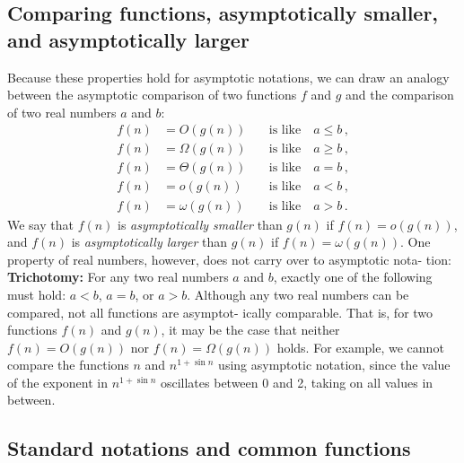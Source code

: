 \documentclass{report}
\begin{document}
        \pagebreak 
        \subsection{Comparing functions, asymptotically smaller, and asymptotically larger}
        \bigbreak \noindent 
        Because these properties hold for asymptotic notations, we can draw an analogy between the asymptotic comparison of two functions $f$ and $g$ and the comparison of two real numbers $a$ and $b$:
        \bigbreak \noindent 
        \[
            \begin{aligned}
                f(n) &= O(g(n)) \quad &\text{is like} \quad a \leq b \, , \\
                f(n) &= \Omega(g(n)) \quad &\text{is like} \quad a \geq b \, , \\
                f(n) &= \Theta(g(n)) \quad &\text{is like} \quad a = b \, , \\
                f(n) &= o(g(n)) \quad &\text{is like} \quad a < b \, , \\
                f(n) &= \omega(g(n)) \quad &\text{is like} \quad a > b \, .
            \end{aligned}
        \]
        We say that \( f(n) \) is \textit{asymptotically smaller} than \( g(n) \) if \( f(n) = o(g(n)) \), and \( f(n) \) 
        is \textit{asymptotically larger} than \( g(n) \) if \( f(n) = \omega(g(n)) \).
        \bigbreak \noindent 
        One property of real numbers, however, does not carry over to asymptotic nota-
        tion:
        \bigbreak \noindent 
        \textbf{Trichotomy:} For any two real numbers \( a \) and \( b \), exactly one of the following must 
        hold: \( a < b \), \( a = b \), or \( a > b \).
        \bigbreak \noindent 
        Although any two real numbers can be compared, not all functions are asymptot-
        ically comparable. That is, for two functions \( f(n) \) and \( g(n) \), it may be the case 
        that neither \( f(n) = O(g(n)) \) nor \( f(n) = \Omega(g(n)) \) holds. For example, we cannot 
        compare the functions \( n \) and \( n^{1 + \sin n} \) using asymptotic notation, since the value of 
        the exponent in \( n^{1 + \sin n} \) oscillates between 0 and 2, taking on all values in between.

        \pagebreak 
        \subsection{Standard notations and common functions}
        \bigbreak \noindent 
\end{document}
